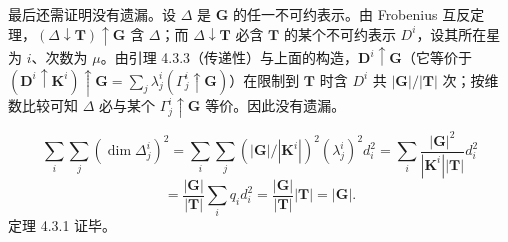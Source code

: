 最后还需证明没有遗漏。设 $\Delta$ 是 $\mathbf{G}$ 的任一不可约表示。由 Frobenius 互反定理，$(\Delta \downarrow \mathbf{T}) \uparrow \mathbf{G}$ 含 $\Delta$；而 $\Delta \downarrow \mathbf{T}$ 必含 $\mathbf{T}$ 的某个不可约表示 $D^{i}$，设其所在星为 $i$、次数为 $\mu$。由引理 4.3.3（传递性）与上面的构造，$\mathbf{D}^{i} \uparrow \mathbf{G}$（它等价于 $(\mathbf{D}^{i} \uparrow \mathbf{K}^{i}) \uparrow \mathbf{G} = \sum_{j}\lambda^{i}_{j}(\Gamma^{i}_{j} \uparrow \mathbf{G})$）在限制到 $\mathbf{T}$ 时含 $D^{i}$ 共 $|\mathbf{G}|/|\mathbf{T}|$ 次；按维数比较可知 $\Delta$ 必与某个 $\Gamma^{i}_{j} \uparrow \mathbf{G}$ 等价。因此没有遗漏。

\begin{equation*}
\sum_{i}\sum_{j}\left(\dim \Delta^{i}_{j}\right)^{2} = \sum_{i}\sum_{j}\left(|\mathbf{G}|/|\mathbf{K}^{i}|\right)^{2}\left(\lambda^{i}_{j}\right)^{2}d^{2}_{i} = \sum_{i}\frac{|\mathbf{G}|^{2}}{|\mathbf{K}^{i}||\mathbf{T}|}d^{2}_{i}
\end{equation*}
\begin{equation*}
= \frac{|\mathbf{G}|}{|\mathbf{T}|}\sum_{i}q_{i}d^{2}_{i} = \frac{|\mathbf{G}|}{|\mathbf{T}|}|\mathbf{T}| = |\mathbf{G}|.
\end{equation*}
定理 4.3.1 证毕。
